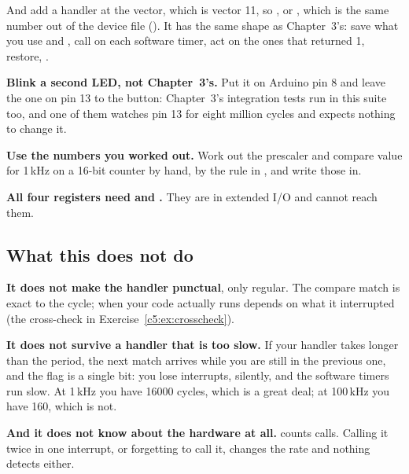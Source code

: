 And add a handler at the  vector, which is vector 11, so , or
, which is the same number out of the device file (). It
has the same shape as Chapter~3's: save what you use and , call  on each
software timer, act on the ones that returned 1, restore, .

\textbf{Blink a second LED, not Chapter~3's.} Put it on Arduino pin 8 and leave the one on pin 13 to
the button: Chapter~3's integration tests run in this suite too, and one of them watches pin 13 for
eight million cycles and expects nothing to change it.

\textbf{Use the numbers you worked out.} Work out the prescaler and compare value for 1\,kHz on a
16-bit counter by hand, by the rule in , and write those in.

\textbf{All four registers need  and .} They are in extended I/O and
 cannot reach them.

\subsection{What this does not do}
\label{c5:sec:notdo}
\textbf{It does not make the handler punctual}, only regular. The compare match is exact to the
cycle; when your code actually runs depends on what it interrupted (the cross-check in
Exercise~\ref{c5:ex:crosscheck}).

\textbf{It does not survive a handler that is too slow.} If your handler takes longer than the
period, the next match arrives while you are still in the previous one, and the flag is a single
bit: you lose interrupts, silently, and the software timers run slow. At 1\,kHz you have 16000
cycles, which is a great deal; at 100\,kHz you have 160, which is not.

\textbf{And it does not know about the hardware at all.}  counts calls. Calling it
twice in one interrupt, or forgetting to call it, changes the rate and nothing detects either.
